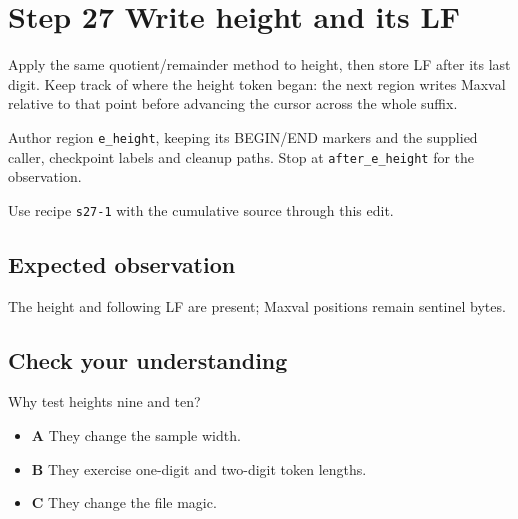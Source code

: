 \section{Step 27 Write height and its LF}\label{ppm-s27}

Apply the same quotient/remainder method to height, then store LF after its last digit. Keep track of where the height token began: the next region writes Maxval relative to that point before advancing the cursor across the whole suffix.

Author region \texttt{e\_height}, keeping its BEGIN/END markers and the supplied caller, checkpoint labels and cleanup paths. Stop at \texttt{after\_e\_height} for the observation.

Use recipe \texttt{s27-1} with the cumulative source through this edit.

\subsection{Expected observation}
The height and following LF are present; Maxval positions remain sentinel bytes.

\subsection{Check your understanding}
Why test heights nine and ten?

\begin{itemize}
\item \textbf{A} They change the sample width.
\item \textbf{B} They exercise one-digit and two-digit token lengths.
\item \textbf{C} They change the file magic.
\end{itemize}

